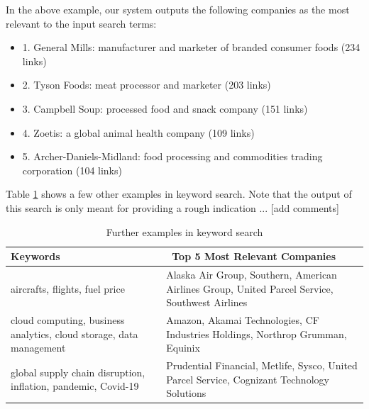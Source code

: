 In the above example, our system outputs the following companies as the most relevant to the input search terms:

\begin{itemize}
	\item 1. General Mills: manufacturer and marketer of branded consumer foods (234 links)
	\item 2. Tyson Foods: meat processor and marketer (203 links)
	\item 3. Campbell Soup: processed food and snack company (151 links)
	\item 4. Zoetis: a global animal health company (109 links)
	\item 5. Archer-Daniels-Midland: food processing and commodities trading corporation (104 links)
\end{itemize}


Table \ref{table:searchexamples} shows a few other examples in keyword search. Note that the output of this search is only meant for providing a rough indication ... [add comments]

\begin{table} 
\small
\centering
\begin{tabular} {| m{15em} |m{25em} |}
\hline
Keywords & \ Top 5 Most Relevant Companies \\ 
\hline

aircrafts, flights, fuel price & Alaska Air Group, Southern, American Airlines Group,  
United Parcel Service, Southwest Airlines \\
\hline
cloud computing, business analytics, cloud storage, data management &
Amazon, Akamai Technologies, CF Industries Holdings, Northrop Grumman, Equinix \\
\hline
global supply chain disruption, inflation, pandemic, Covid-19 & Prudential Financial, Metlife, Sysco, United Parcel Service, Cognizant Technology Solutions\\
\hline
\end{tabular}
\caption{Further examples in keyword search}
\label{table:searchexamples}
\end{table}





